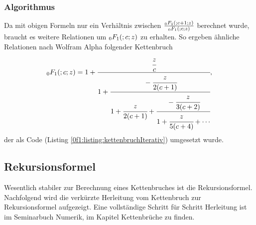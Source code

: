 \subsubsection{Algorithmus}
Da mit obigen Formeln nur ein Verhältnis zwischen $	\frac{\mathstrut_0F_1(;c+1;z)}{\mathstrut_0F_1(;c;z)}$ berechnet wurde, braucht es weitere Relationen um $\mathstrut_0F_1(;c;z)$ zu erhalten.
So ergeben ähnliche Relationen nach Wolfram Alpha \cite{0f1:wolfram-0f1} folgender Kettenbruch
\begin{equation}
	\label{0f1:math:kettenbruch:0f1:eq}
	\mathstrut_0F_1(;c;z) = 1 + \cfrac{\cfrac{z}{c}}{1+\cfrac{-\cfrac{z}{2(c+1)}}{1+\cfrac{z}{2(c+1)}+\cfrac{-\cfrac{z}{3(c+2)}}{1+\cfrac{z}{5(c+4)} + \cdots}}},
\end{equation}
der als Code (Listing \ref{0f1:listing:kettenbruchIterativ})  umgesetzt wurde. 




\subsection{Rekursionsformel
\label{0f1:subsection:rekursionsformel}}
Wesentlich stabiler zur Berechnung eines Kettenbruches ist die Rekursionsformel. Nachfolgend wird die verkürzte Herleitung vom Kettenbruch zur Rekursionsformel aufgezeigt. Eine vollständige Schritt für Schritt Herleitung ist im Seminarbuch Numerik, im Kapitel Kettenbrüche \cite{0f1:kettenbrueche} zu finden.


